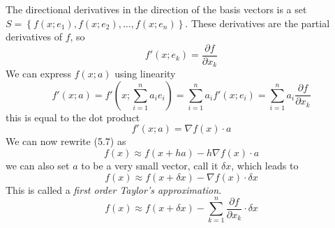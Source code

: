 \documentclass[../linear-spaces.tex]{subfiles}
\begin{document}
The directional derivatives in the direction of the basis vectors is a set
$S = \left\{f(x; e_1), f(x; e_2), \dots,f(x; e_n)\right\}$. These derivatives
are
the partial derivatives of $f$, so
\begin{equation}
    f'(x; e_k) = \dfrac{\partial f}{\partial x_k}
\end{equation}
We can express $f(x; a)$ using linearity
\begin{equation}
    f'(x; a) = f'\left(x; \sum_{i=1}^{n}{a_i e_i} \right)
    = \sum_{i=1}^{n}a_i f'\left(x; e_i\right) =
    \sum_{i=1}^{n}a_i \dfrac{\partial f}{\partial x_k}
\end{equation}
this is equal to the dot product
\begin{equation}
    f'(x; a) = \nabla f(x) \cdot a
\end{equation}
We can now rewrite (5.7) as
\begin{equation}
    f(x) \approx f(x+ha) - h\nabla f(x)\cdot a
\end{equation}
we can also set $a$ to be a very small vector, call it $\delta x$, which leads
to
\begin{equation}
    f(x) \approx f(x+\delta x) - \nabla f(x)\cdot \delta x
\end{equation}
This is called a \textit{first order Taylor's approximation}.
\begin{equation}
    f(x) \approx f(x+\delta x) - \sum_{k=1}^{n} \dfrac{\partial f}{\partial x_k}\cdot \delta x
\end{equation}
\end{document}
